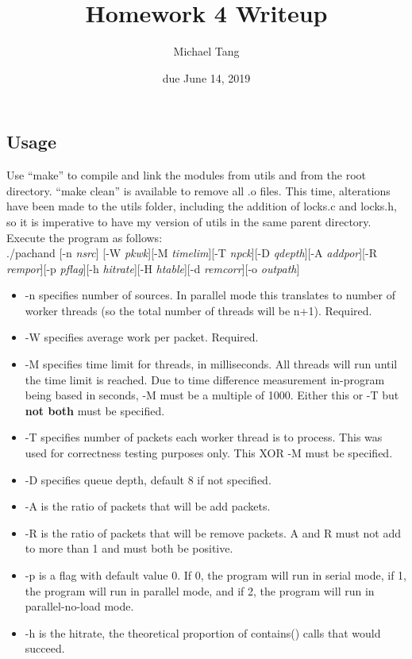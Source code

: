 \documentclass{article}
\title{Homework 4 Writeup}
\author{Michael Tang}
\date{due June 14, 2019}
\begin{document}
\maketitle
\begin{adjustwidth}{-2cm}{-2cm}
\section{Usage}
Use ``make'' to compile and link the modules from utils and from the root directory. ``make clean'' is available to remove all .o files. This time, alterations have been made to the utils folder, including the addition of locks.c and locks.h, so it is imperative to have my version of utils in the same parent directory.\\
Execute the program as follows:\\
./pachand [-n \textit{nsrc}] [-W \textit{pkwk}][-M \textit{timelim}][-T \textit{npck}][-D \textit{qdepth}][-A \textit{addpor}][-R \textit{rempor}][-p \textit{pflag}][-h \textit{hitrate}][-H \textit{htable}][-d \textit{remcorr}][-o \textit{outpath}]
\begin{itemize}
	\item -n specifies number of sources. In parallel mode this translates to number of worker threads (so the total number of threads will be n+1). Required.
	\item -W specifies average work per packet. Required.
	\item -M specifies time limit for threads, in milliseconds. All threads will run until the time limit is reached. Due to time difference measurement in-program being based in seconds, -M must be a multiple of 1000. Either this or -T but \textbf{not both} must be specified.
	\item -T specifies number of packets each worker thread is to process. This was used for correctness testing purposes only. This XOR -M must be specified.
	\item -D specifies queue depth, default 8 if not specified.
	\item -A is the ratio of packets that will be add packets.
	\item -R is the ratio of packets that will be remove packets. A and R must not add to more than 1 and must both be positive.
	\item -p is a flag with default value 0. If 0, the program will run in serial mode, if 1, the program will run in parallel mode, and if 2, the program will run in parallel-no-load mode.
	\item -h is the hitrate, the theoretical proportion of contains() calls that would succeed.

\end{itemize}
\end{adjustwidth}
\end{document}
